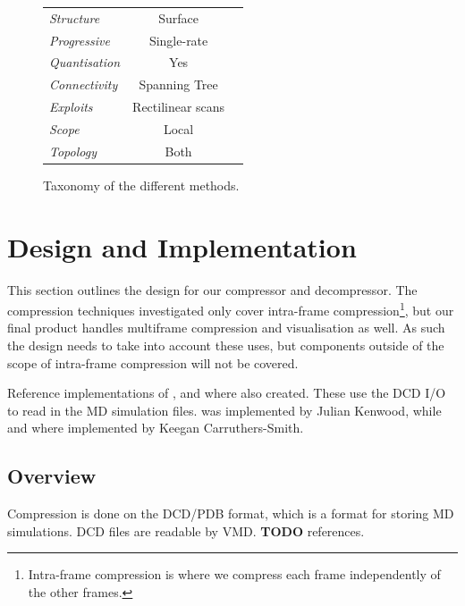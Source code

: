 \documentclass{report}
\newcommand{\todo}{\textbf{TODO} }
\begin{document}
\begin{figure}
{\begin{tabular}{||l|c|c||}
  \hline

  \emph{Structure} & Surface & \\

  \emph{Progressive} & Single-rate & \\

  \emph{Quantisation} & Yes & \\

  \emph{Connectivity} & Spanning Tree & \\

  \emph{Exploits} & Rectilinear scans & \\

  \emph{Scope} & Local & \\

  \emph{Topology} & Both & \\

  \hline
\end{tabular}
}
\caption{Taxonomy of the different methods.}\label{fig:taxonomy}
\end{figure}


\chapter{Design and Implementation}

This section outlines the design for our compressor and decompressor. The
compression techniques investigated only cover intra-frame
compression\footnote{Intra-frame compression is where we compress each frame
  independently of the other frames.}, but our final product handles
multiframe compression and visualisation as well. As such the design needs to
take into account these uses, but components outside of the scope of
intra-frame compression will not be covered.

Reference implementations of \citet{devillers2000gci}, \citet{gumholdcomp} and
\citet{omeltchenko2000sls} where also created. These use the DCD I/O to read
in the MD simulation files. \citet{omeltchenko2000sls} was implemented by
Julian Kenwood, while \cite{devillers2000gci} and \cite{gumholdcomp} where
implemented by Keegan Carruthers-Smith.

\section{Overview}

Compression is done on the DCD/PDB format, which is a format for storing MD
simulations. DCD files are readable by VMD. \todo references.
\end{document}
